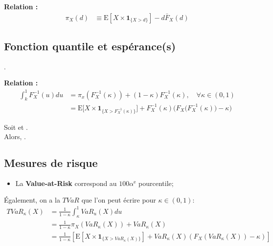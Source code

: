 \documentclass[10pt, french]{article}
\begin{document}
\begin{multicols*}{2}
\textbf{Relation :}
\begin{align*}
	\pi_{X}(d)
	&\equiv	\text{E}[X	\times	\bm{1}_{\{X	>	d\}}]	-	d\bar{F}_{X}(d)
\end{align*}


\subsection{Fonction quantile et espérance(s)}
.

\textbf{Relation :}
\begin{align*}
	\int_{k}^{1}F_{X}^{-1}(u)du
	&=	\pi_{x}\left(F_{X}^{-1}(\kappa)\right) + (1 - \kappa)F_{X}^{-1}(\kappa), \quad \forall \kappa \in (0, 1)	\\
	&=	\text{E}\Big[X	\times	\bm{1}_{\{X	>	F_{X}^{-1}(\kappa)\}}\Big]+ 
		F_{X}^{-1}(\kappa)\bigg( F_{X}\Big(F_{X}^{-1}(\kappa)\Big)	-	\kappa \bigg)
\end{align*}

\begin{rappel_enhanced}
Soit  et .\\

Alors, .
\end{rappel_enhanced}

\subsection{Mesures de risque}
\begin{itemize}
	\item	La \textbf{Value-at-Risk} correspond au $100\alpha^{\text{e}}$ pourcentile;
\end{itemize}

Également, on a la $TVaR$ que l'on peut écrire pour $\kappa \in (0, 1)$: 
\begin{align*}
	TVaR_{\kappa}(X)
	&=	\frac{1}{1 - \kappa}\int_{\kappa}^{1}	VaR_{u}(X)du	\\
	&=	\frac{1}{1 - \kappa}\pi_{X}\left(VaR_{\kappa}(X)\right) + VaR_{\kappa}(X)	\\
	&=	\frac{1}{1 - \kappa}\left[	\text{E}[X \times \bm{1}_{\{X	>	VaR_{\kappa}(X)\}}] + VaR_{\kappa}(X) \left(F_{X}\left(VaR_{\kappa}(X)\right)	-	\kappa\right)	\right]
\end{align*}


\end{multicols*}
\end{document}
